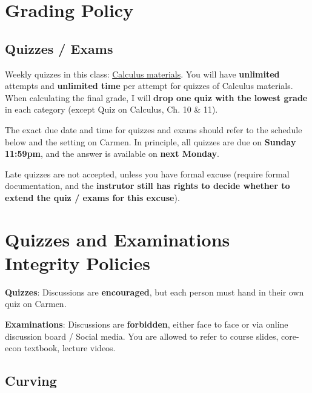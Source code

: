 \documentclass[12pt]{article}
\begin{document}
\section*{Grading Policy}

\subsection*{Quizzes / Exams}

Weekly quizzes in this class: \underline{Calculus materials}.
You will have \textbf{unlimited} attempts and \textbf{unlimited time} per attempt for quizzes of Calculus materials.
When calculating the final grade, I will \textbf{drop one quiz with the lowest grade} in each category (except Quiz on Calculus, Ch. 10 \& 11).

The exact due date and time for quizzes and exams should refer to the schedule below and the setting on Carmen.
In principle, all quizzes are due on \textbf{Sunday 11:59pm}, and the answer is available on \textbf{next Monday}.

Late quizzes are not accepted, unless you have formal excuse (require formal documentation, and the \textbf{instrutor still has rights to decide whether to extend the quiz / exams for this excuse}).

\section*{Quizzes and Examinations Integrity Policies}

\textbf{Quizzes}: Discussions are \textbf{encouraged}, but each person must hand in their own quiz on Carmen.

\textbf{Examinations}: Discussions are \textbf{forbidden}, either face to face or via online discussion board / Social media. You are allowed to refer to course slides, core-econ textbook, lecture videos.



\subsection*{Curving}
\end{document}
